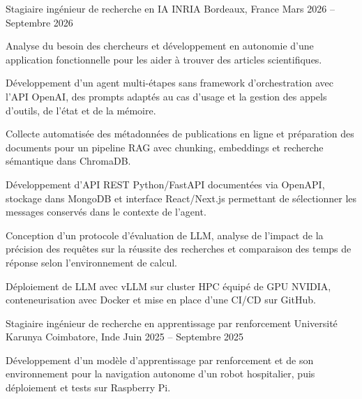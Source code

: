 
\begin{cventries}
  \cventry
    {Stagiaire ingénieur de recherche en IA}
    {INRIA}
    {Bordeaux, France}
    {Mars 2026 -- Septembre 2026}
    {
      \begin{cvitems}
        \item {Analyse du besoin des chercheurs et développement en autonomie d’une application fonctionnelle pour les aider à trouver des articles scientifiques.}
        \item {Développement d’un agent multi-étapes sans framework d’orchestration avec l’API OpenAI, des prompts adaptés au cas d’usage et la gestion des appels d’outils, de l’état et de la mémoire.}
        \item {Collecte automatisée des métadonnées de publications en ligne et préparation des documents pour un pipeline RAG avec chunking, embeddings et recherche sémantique dans ChromaDB.}
        \item {Développement d’API REST Python/FastAPI documentées via OpenAPI, stockage dans MongoDB et interface React/Next.js permettant de sélectionner les messages conservés dans le contexte de l’agent.}
        \item {Conception d’un protocole d’évaluation de LLM, analyse de l’impact de la précision des requêtes sur la réussite des recherches et comparaison des temps de réponse selon l’environnement de calcul.}
        \item {Déploiement de LLM avec vLLM sur cluster HPC équipé de GPU NVIDIA, conteneurisation avec Docker et mise en place d’une CI/CD sur GitHub.}
      \end{cvitems}
    }

  \cventry
    {Stagiaire ingénieur de recherche en apprentissage par renforcement}
    {Université Karunya}
    {Coimbatore, Inde}
    {Juin 2025 -- Septembre 2025}
    {
      \begin{cvitems}
        \item {Développement d’un modèle d’apprentissage par renforcement et de son environnement pour la navigation autonome d’un robot hospitalier, puis déploiement et tests sur Raspberry Pi.}
      \end{cvitems}
    }
\end{cventries}
